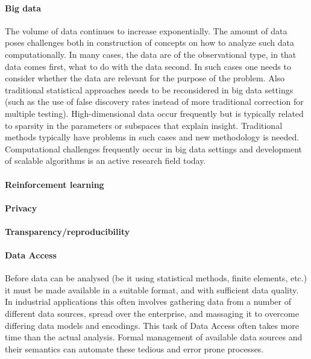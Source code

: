\documentclass[a4paper,10pt]{article}
\begin{document}
\paragraph{Big data} The volume of data continues to increase exponentially. The amount of data poses challenges both in construction of concepts on how to analyze such data computationally.
In many cases, the data are of the observational type, in that data comes first, what to do with the data second. In such cases one needs to consider whether the data are relevant for the purpose of the problem. Also traditional statistical approaches  needs to be reconsidered in big data settings (such as the use of false discovery rates instead of more traditional correction for multiple testing).
High-dimensional data occur frequently but is typically related to sparsity in the parameters or subspaces that explain insight. Traditional methods typically have problems in such cases and new methodology is needed. Computational challenges frequently occur in big data settings and development of scalable algorithms is an active research field today. 

\paragraph{Reinforcement learning}

\paragraph{Privacy}

\paragraph{Transparency/reproducibility}


\paragraph{Data Access}

Before data can be analysed (be it using statistical methods, finite elements, etc.) it must be made available in a suitable format, and with sufficient data quality.  In industrial applications this often involves gathering data from a number of different data sources, spread over the enterprise, and massaging it to overcome differing data models and encodings.  This task of Data Access often takes more time than the actual analysis.  Formal management of available data sources and their semantics can automate these tedious and error prone processes.
\end{document}
